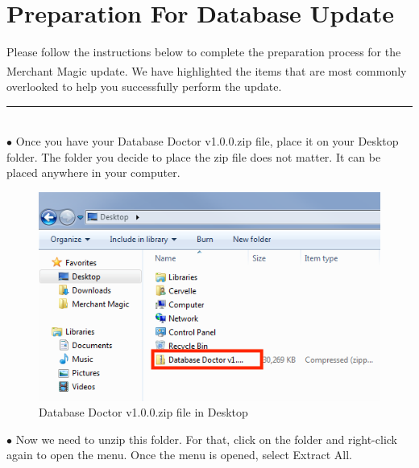 \documentclass[a4paper, 11pt]{article}
\begin{document}
\section{Preparation For Database Update}

Please follow the instructions below to complete the preparation process for the Merchant Magic\textsuperscript{\textregistered} update. We have highlighted the items that are most commonly overlooked to help you successfully perform the update. \\

\noindent\rule{\textwidth}{0.5pt}\\

$\bullet$ Once you have your Database Doctor v1.0.0.zip file, place it on your Desktop folder. The folder you decide to place the zip file does not matter. It can be placed anywhere in your computer.

\begin{figure}[h]
    \centering
    \includegraphics[width=\textwidth]{capture 1}
    \caption{Database Doctor v1.0.0.zip file in Desktop}
\end{figure}

\pagebreak

\vspace*{\fill}
$\bullet$ Now we need to unzip this folder. For that, click on the folder and right-click again to open the menu. Once the menu is opened, select Extract All.
\end{document}
